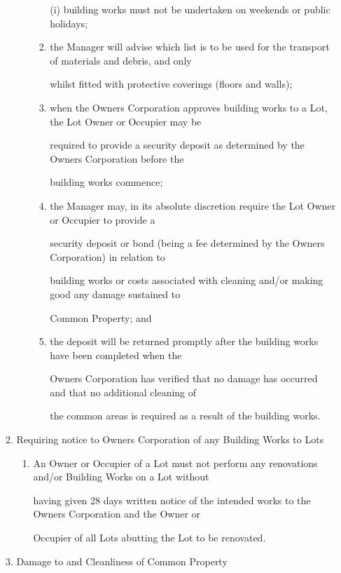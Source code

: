 \documentclass{article}
\begin{document}
\begin{enumerate}[label=\arabic*.]
\begin{enumerate}[label=\arabic{enumi}.\arabic*.]
\begin{enumerate}[label=(\arabic*)]
\begin{enumerate}[label=(\alph*)]
\newpage

(i) building works must not be undertaken on weekends or public holidays; 

\item  the Manager will advise which list is to be used for the transport of materials and debris, and only 

whilst fitted with protective coverings (floors and walls); 

\item  when the Owners Corporation approves building works to a Lot, the Lot Owner or Occupier may be 

required to provide a security deposit as determined by the Owners Corporation before the 

building works commence; 

\item  the Manager may, in its absolute discretion require the Lot Owner or Occupier to provide a 

security deposit or bond (being a fee determined by the Owners Corporation) in relation to 

building works or costs associated with cleaning and/or making good any damage sustained to 

Common Property; and 

\item  the deposit will be returned promptly after the building works have been completed when the 

Owners Corporation has verified that no damage has occurred and that no additional cleaning of 

the common areas is required as a result of the building works. 

\end{enumerate}
\end{enumerate}
\item  Requiring notice to Owners Corporation of any Building Works to Lots 

\begin{enumerate}[label=(\arabic*)]
\item  An Owner or Occupier of a Lot must not perform any renovations and/or Building Works on a Lot without 

having given 28 days written notice of the intended works to the Owners Corporation and the Owner or 

Occupier of all Lots abutting the Lot to be renovated. 

\end{enumerate}
\item  Damage to and Cleanliness of Common Property 


\end{enumerate}
\end{enumerate}
\end{document}
